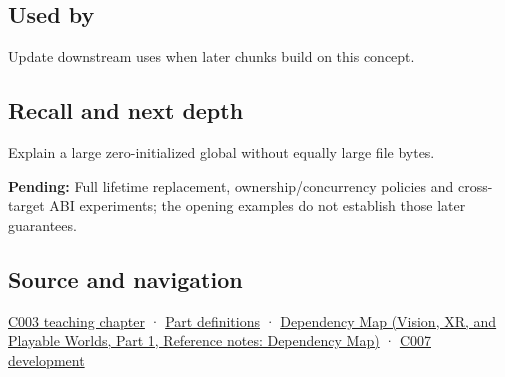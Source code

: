 \subsection{Used by}\label{appendix-17c93c4c2f19-used-by}

\hypertarget{appendix-17c93c4c2f19-used-by}{}

Update downstream uses when later chunks build on this concept.

\subsection{Recall and next depth}\label{appendix-17c93c4c2f19-recall-and-next-depth}

\hypertarget{appendix-17c93c4c2f19-recall-and-next-depth}{}

Explain a large zero-initialized global without equally large file bytes.

\textbf{Pending:} Full lifetime replacement, ownership/concurrency policies and cross-target ABI experiments; the opening examples do not establish those later guarantees.

\subsection{Source and navigation}\label{appendix-17c93c4c2f19-source-and-navigation}

\hypertarget{appendix-17c93c4c2f19-source-and-navigation}{}

\hyperref[01-foundations-i-ch002-where-the-bytes-live]{C003 teaching chapter} · \hyperref[appendix-fd090d982a15-m003---parts-41-60]{Part definitions} · \href{../07-Vision-XR-and-Playable-Worlds-P01/main.pdf\#appendix-4ad47bdd269a}{Dependency Map (Vision, XR, and Playable Worlds, Part 1, Reference notes: Dependency Map)} · \hyperref[01-foundations-i-ch002-a-name-does-not-decide-how-long-storage-lasts]{C007 development}
